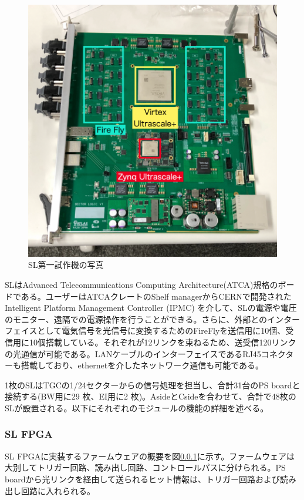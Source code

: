 \begin{figure} 
\centering
\includegraphics[width=16cm]{fig/Intro/TGC_SL.jpg}
\caption[SL第一試作機の写真]{SL第一試作機の写真}
\label{TGC_SL}
\end{figure}

SLはAdvanced Telecommunications Computing Architecture(ATCA)規格のボードである。ユーザーはATCAクレートのShelf managerからCERNで開発されたIntelligent Platform Management Controller (IPMC) を介して、SLの電源や電圧のモニター、遠隔での電源操作を行うことができる。さらに、外部とのインターフェイスとして電気信号を光信号に変換するためのFireFlyを送信用に10個、受信用に10個搭載している。それぞれが12リンクを束ねるため、送受信120リンクの光通信が可能である。LANケーブルのインターフェイスであるRJ45コネクターも搭載しており、ethernetを介したネットワーク通信も可能である。

1枚のSLはTGCの1/24セクターからの信号処理を担当し、合計31台のPS boardと接続する(BW用に29 枚、EI用に2 枚)。AsideとCsideを合わせて、合計で48枚のSLが設置される。以下にそれぞれのモジュールの機能の詳細を述べる。

    \subsubsection{SL FPGA}
SL FPGAに実装するファームウェアの概要を図\ref{}に示す。ファームウェアは大別してトリガー回路、読み出し回路、コントロールパスに分けられる。PS boardから光リンクを経由して送られるヒット情報は、トリガー回路および読み出し回路に入れられる。

